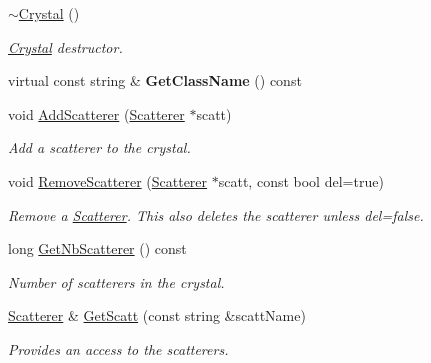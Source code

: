 \begin{DoxyCompactItemize}
\mbox{\hyperlink{class_obj_cryst_1_1_crystal_a13a9e007a57aeb11a5d808099c56c2b5}{$\sim$\+Crystal}} ()
\begin{DoxyCompactList}\small\item\em \mbox{\hyperlink{class_obj_cryst_1_1_crystal}{Crystal}} destructor. \end{DoxyCompactList}\item 
\mbox{\label{class_obj_cryst_1_1_crystal_ab36b000665729e5c474be22c987f7fa5}} 
virtual const string \& {\bfseries Get\+Class\+Name} () const
\item 
void \mbox{\hyperlink{class_obj_cryst_1_1_crystal_acee480ad824aa0eedf78a4fa414cf347}{Add\+Scatterer}} (\mbox{\hyperlink{class_obj_cryst_1_1_scatterer}{Scatterer}} $\ast$scatt)
\begin{DoxyCompactList}\small\item\em Add a scatterer to the crystal. \end{DoxyCompactList}\item 
\mbox{\label{class_obj_cryst_1_1_crystal_ac2755d27280cfa572aa334e6e596da98}} 
void \mbox{\hyperlink{class_obj_cryst_1_1_crystal_ac2755d27280cfa572aa334e6e596da98}{Remove\+Scatterer}} (\mbox{\hyperlink{class_obj_cryst_1_1_scatterer}{Scatterer}} $\ast$scatt, const bool del=true)
\begin{DoxyCompactList}\small\item\em Remove a \mbox{\hyperlink{class_obj_cryst_1_1_scatterer}{Scatterer}}. This also deletes the scatterer unless del=false. \end{DoxyCompactList}\item 
\mbox{\label{class_obj_cryst_1_1_crystal_aced7120968bec9027897ee8a3c56bd50}} 
long \mbox{\hyperlink{class_obj_cryst_1_1_crystal_aced7120968bec9027897ee8a3c56bd50}{Get\+Nb\+Scatterer}} () const
\begin{DoxyCompactList}\small\item\em Number of scatterers in the crystal. \end{DoxyCompactList}\item 
\mbox{\hyperlink{class_obj_cryst_1_1_scatterer}{Scatterer}} \& \mbox{\hyperlink{class_obj_cryst_1_1_crystal_ab991f8f3cc005760f939f7d41694cfdf}{Get\+Scatt}} (const string \&scatt\+Name)
\begin{DoxyCompactList}\small\item\em Provides an access to the scatterers. \end{DoxyCompactList}\item 

\end{DoxyCompactItemize}
